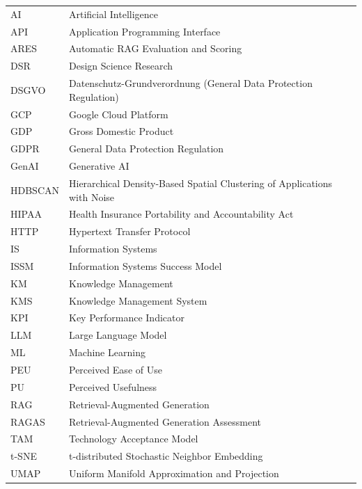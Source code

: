 \documentclass[
	english,
	ruledheaders=section,%
	class=report,%
	thesis={type=bachelor},%
	accentcolor=1b,%
	custommargins=true,%
	marginpar=false,%
	parskip=half-,%
	fontsize=11pt,%
	DIV=14,
]{tudapub}
\begin{document}
\begin{xtabular}{ll}
AI & Artificial Intelligence\\
API & Application Programming Interface\\
ARES & Automatic RAG Evaluation and Scoring \\
DSR & Design Science Research\\
DSGVO & Datenschutz-Grundverordnung (General Data Protection Regulation)\\
GCP & Google Cloud Platform\\
GDP & Gross Domestic Product\\
GDPR & General Data Protection Regulation\\
GenAI & Generative AI\\
HDBSCAN & Hierarchical Density-Based Spatial Clustering of Applications with Noise\\
HIPAA & Health Insurance Portability and Accountability Act\\
HTTP & Hypertext Transfer Protocol\\
IS & Information Systems\\
ISSM & Information Systems Success Model\\
KM & Knowledge Management\\
KMS & Knowledge Management System\\
KPI & Key Performance Indicator\\
LLM & Large Language Model\\
ML & Machine Learning\\
PEU & Perceived Ease of Use\\
PU & Perceived Usefulness\\
RAG & Retrieval-Augmented Generation\\
RAGAS & Retrieval-Augmented Generation Assessment \\
TAM & Technology Acceptance Model\\
t-SNE & t-distributed Stochastic Neighbor Embedding \\
UMAP & Uniform Manifold Approximation and Projection\\
\end{xtabular}

\onehalfspacing
\setcounter{seitenzahlroemisch}{\value{page}}
\end{document}
